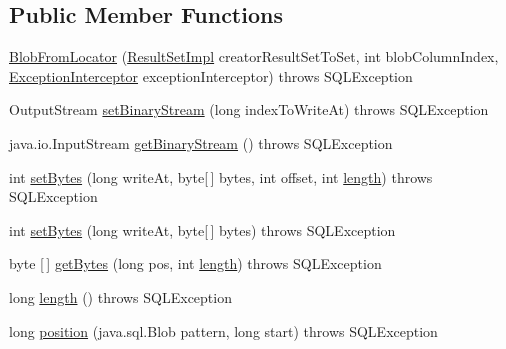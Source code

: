 \subsection*{Public Member Functions}
\begin{DoxyCompactItemize}
\item 
\mbox{\hyperlink{classcom_1_1mysql_1_1cj_1_1jdbc_1_1_blob_from_locator_a31ec6c3d1950b3a8a5270eac15b5a4fc}{Blob\+From\+Locator}} (\mbox{\hyperlink{classcom_1_1mysql_1_1cj_1_1jdbc_1_1result_1_1_result_set_impl}{Result\+Set\+Impl}} creator\+Result\+Set\+To\+Set, int blob\+Column\+Index, \mbox{\hyperlink{interfacecom_1_1mysql_1_1cj_1_1exceptions_1_1_exception_interceptor}{Exception\+Interceptor}} exception\+Interceptor)  throws S\+Q\+L\+Exception 
\item 
Output\+Stream \mbox{\hyperlink{classcom_1_1mysql_1_1cj_1_1jdbc_1_1_blob_from_locator_a9511b7ab8e28f5815a71bfaaeb3ed882}{set\+Binary\+Stream}} (long index\+To\+Write\+At)  throws S\+Q\+L\+Exception 
\item 
java.\+io.\+Input\+Stream \mbox{\hyperlink{classcom_1_1mysql_1_1cj_1_1jdbc_1_1_blob_from_locator_a4729992908a7cc12876aaaef51f7ce8e}{get\+Binary\+Stream}} ()  throws S\+Q\+L\+Exception 
\item 
int \mbox{\hyperlink{classcom_1_1mysql_1_1cj_1_1jdbc_1_1_blob_from_locator_a87f6620378f2f7781c3d2ae4f7cca68e}{set\+Bytes}} (long write\+At, byte\mbox{[}$\,$\mbox{]} bytes, int offset, int \mbox{\hyperlink{classcom_1_1mysql_1_1cj_1_1jdbc_1_1_blob_from_locator_a6eea7dd5b29ebcd066beac855648fe35}{length}})  throws S\+Q\+L\+Exception 
\item 
int \mbox{\hyperlink{classcom_1_1mysql_1_1cj_1_1jdbc_1_1_blob_from_locator_a738e1fc68ebb03c3bd2f533930616d69}{set\+Bytes}} (long write\+At, byte\mbox{[}$\,$\mbox{]} bytes)  throws S\+Q\+L\+Exception 
\item 
byte \mbox{[}$\,$\mbox{]} \mbox{\hyperlink{classcom_1_1mysql_1_1cj_1_1jdbc_1_1_blob_from_locator_ac9d460d4f9f59946014b373d7d703564}{get\+Bytes}} (long pos, int \mbox{\hyperlink{classcom_1_1mysql_1_1cj_1_1jdbc_1_1_blob_from_locator_a6eea7dd5b29ebcd066beac855648fe35}{length}})  throws S\+Q\+L\+Exception 
\item 
long \mbox{\hyperlink{classcom_1_1mysql_1_1cj_1_1jdbc_1_1_blob_from_locator_a6eea7dd5b29ebcd066beac855648fe35}{length}} ()  throws S\+Q\+L\+Exception 
\item 
long \mbox{\hyperlink{classcom_1_1mysql_1_1cj_1_1jdbc_1_1_blob_from_locator_a9883a07889dbe51799cbbddb55396503}{position}} (java.\+sql.\+Blob pattern, long start)  throws S\+Q\+L\+Exception 

\end{DoxyCompactItemize}
